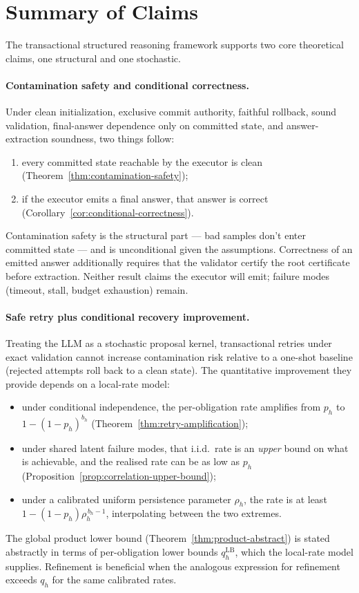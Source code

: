 \documentclass[11pt]{article}
\begin{document}
\section{Summary of Claims}

The transactional structured reasoning framework supports two core
theoretical claims, one structural and one stochastic.

\paragraph{Contamination safety and conditional correctness.}
Under clean initialization, exclusive commit authority, faithful rollback,
sound validation, final-answer dependence only on committed state, and
answer-extraction soundness, two things follow:
\begin{enumerate}[label=(\roman*)]
\item every committed state reachable by the executor is clean (Theorem~\ref{thm:contamination-safety});
\item if the executor emits a final answer, that answer is correct
(Corollary~\ref{cor:conditional-correctness}).
\end{enumerate}
Contamination safety is the structural part — bad samples don't enter
committed state — and is unconditional given the assumptions. Correctness
of an emitted answer additionally requires that the validator certify the
root certificate before extraction. Neither result claims the executor will
emit; failure modes (timeout, stall, budget exhaustion) remain.

\paragraph{Safe retry plus conditional recovery improvement.}
Treating the LLM as a stochastic proposal kernel, transactional retries
under exact validation cannot increase contamination risk relative to a
one-shot baseline (rejected attempts roll back to a clean state). The
quantitative improvement they provide depends on a local-rate model:
\begin{itemize}[leftmargin=*]
\item under conditional independence, the per-obligation rate amplifies from
$p_h$ to $1-(1-p_h)^{b_h}$ (Theorem~\ref{thm:retry-amplification});
\item under shared latent failure modes, that i.i.d.\ rate is an \emph{upper}
bound on what is achievable, and the realised rate can be as low as $p_h$
(Proposition~\ref{prop:correlation-upper-bound});
\item under a calibrated uniform persistence parameter $\rho_h$, the rate
is at least $1-(1-p_h)\rho_h^{\,b_h-1}$, interpolating between the two
extremes.
\end{itemize}
The global product lower bound (Theorem~\ref{thm:product-abstract}) is
stated abstractly in terms of per-obligation lower bounds
$q_h^{\mathrm{LB}}$, which the local-rate model supplies. Refinement is
beneficial when the analogous expression for refinement exceeds $q_h$ for
the same calibrated rates.
\end{document}
